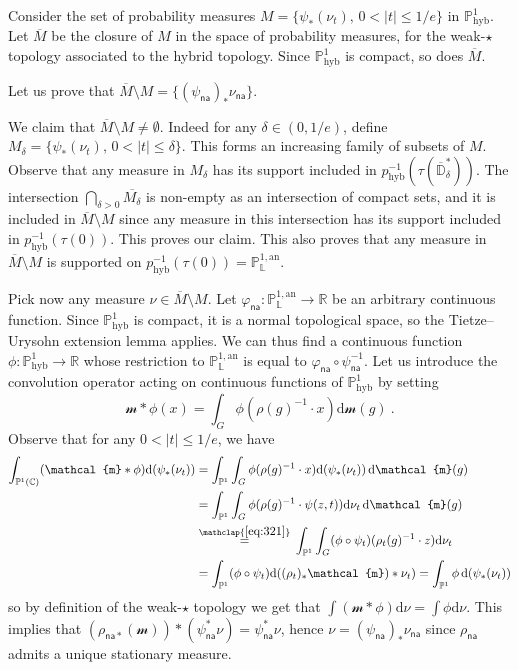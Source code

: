 \documentclass[10pt]{amsart}
\theoremstyle{definition}\newtheorem{defi}[theo]{Definition}\newtheorem{rema}[theo]{Remark}\newtheorem{exam}[theo]{Example}\newtheorem{exem}[theo]{Example}\newtheorem{nota}[theo]{Notation}
\DeclareMathOperator{\hyb}{hyb}
\newcommand{\cc}{\mathbb{C}}
\newcommand{\phyb}{{\mathbb{P}^1_{\mathrm{hyb}}}}
\newcommand{\sm}{\mathcal{m}}
\newcommand{\R}{{\mathbb R}}
\newcommand{\D}{\mathbb{D}}
\newcommand{\an}{\mathrm{an}}
\newcommand{\PP}{\mathbb{P}}
\newcommand{\Laurent}{\mathbb{L}}
\newcommand{\na}{\mathsf{na}}
\newcommand{\inv}{^{-1}}
\newcommand*{\dd}{\mathrm{d}}
\newcommand*{\dnu}{\dd \nu}
\newcommand*{\dsm}{\dd \sm}
\begin{document}
Consider the set of probability measures $M = \{ \psi_*(\nu_t), \, 0 < |t| \le 1/e\}$ in $\phyb$. Let $\overline{M}$ be the closure of $M$ in the space of probability measures, for the weak-$\star$ topology associated to the hybrid topology. Since $\PP^{1}_{\hyb}$ is compact, so does $\overline{M}$.

Let us prove that $\overline{M} \setminus M = \{(\psi_\na)_* \nu_{\na}\}$.

We claim that $\overline{M} \setminus M\neq \emptyset$. Indeed for any $\delta \in (0, 1/e)$, define $M_\delta =\{ \psi_*(\nu_t), \, 0 < |t| \le \delta\}$. This forms an increasing family of subsets of $M$. Observe that any measure in $M_\delta$ has its support included in $p_{\hyb}^{-1}(\tau(\overline{\D}^*_\delta))$. The intersection $\bigcap_{\delta>0} \overline{M_\delta}$ is non-empty as an intersection of compact sets, and it is included in $\overline{M} \setminus M$ since any measure in this intersection has its support included in $p_{\hyb}^{-1}(\tau(0))$. This proves our claim. This also proves that any measure in $\overline{M} \setminus M$ is supported on $p_{\hyb}^{-1}(\tau(0)) = \PP^{1,\an}_{\Laurent}$.

Pick now any measure $\nu \in \overline{M} \setminus M$. Let $\varphi_{\na} : \PP^{1,\an}_{\Laurent} \to \R$ be an arbitrary continuous function. Since $\phyb$ is compact, it is a normal topological space, so the Tietze--Urysohn extension lemma applies. We can thus find a continuous function $\phi: \phyb \to \R$ whose restriction to $\PP^{1,\an}_{\Laurent}$ is equal to $\varphi_{\na}\circ \psi_\na\inv$. Let us introduce the convolution operator acting on continuous functions of $\phyb$ by setting
\[
\sm \ast \phi (x) = \int_G \phi(\rho(g)^{-1} \cdot x) \dsm(g)~.
\]
Observe that for any $0 < |t| \le 1/e$, we have
\begin{align*}
\int_{\PP^1(\cc)} (\sm \ast \phi) \dd(\psi_*(\nu_t)) &=
\int_{\PP^1} \int_G \phi(\rho(g)^{-1} \cdot x) \dd(\psi_*(\nu_t)) \, \dsm(g)
\\ & = \int_{\PP^1} \int_G \phi(\rho(g) ^{-1} \cdot \psi(z,t)) \dnu_t \, \dsm(g)
\\
& \overset{\mathclap{\eqref{eq:321}}}{=}\, \int_{\PP^1} \int_G (\phi \circ \psi_t) (\rho_t(g)^{-1} \cdot z) \dnu_t
\\ &= \int_{\PP^1} (\phi \circ \psi_t) \dd((\rho_t)_*\sm) * \nu_t) = \int_{\PP^1} \phi \, \dd(\psi_{*}(\nu_t))
\end{align*}
so by definition of the weak-$\star$ topology we get that $\int (\sm \ast \phi) \dnu= \int \phi \dnu$. This implies that $(\rho_{\na*}(\sm)) \ast (\psi_\na^*\nu) = \psi_\na^*\nu$, hence $\nu = (\psi_\na)_*\nu_{\na}$ since $\rho_{\na}$ admits a unique stationary measure.
\end{document}
